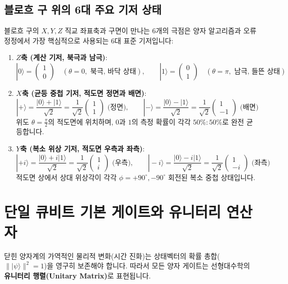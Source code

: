 \documentclass[11pt, a4paper]{article}
\newcommand{\ket}[1]{|#1\rangle}
\theoremstyle{definition}
\begin{document}
\subsection{블로흐 구 위의 6대 주요 기저 상태}
블로흐 구의 $X, Y, Z$ 직교 좌표축과 구면이 만나는 6개의 극점은 양자 알고리즘과 오류 정정에서 가장 핵심적으로 사용되는 6대 표준 기저입니다:
\begin{enumerate}
    \item \textbf{$Z$축 (계산 기저, 북극과 남극)}:
    $$\ket{0} = \begin{pmatrix} 1 \\ 0 \end{pmatrix} \quad (\theta=0, \text{ 북극, 바닥 상태}), \qquad \ket{1} = \begin{pmatrix} 0 \\ 1 \end{pmatrix} \quad (\theta=\pi, \text{ 남극, 들뜬 상태})$$
    \item \textbf{$X$축 (균등 중첩 기저, 적도면 정면과 배면)}:
    $$\ket{+} = \frac{\ket{0}+\ket{1}}{\sqrt{2}} = \frac{1}{\sqrt{2}}\begin{pmatrix} 1 \\ 1 \end{pmatrix} \text{ (정면)}, \qquad \ket{-} = \frac{\ket{0}-\ket{1}}{\sqrt{2}} = \frac{1}{\sqrt{2}}\begin{pmatrix} 1 \\ -1 \end{pmatrix} \text{ (배면)}$$
    위도 $\theta = \frac{\pi}{2}$의 적도면에 위치하며, $0$과 $1$의 측정 확률이 각각 $50\% : 50\%$로 완전 균등합니다.
    \item \textbf{$Y$축 (복소 위상 기저, 적도면 우측과 좌측)}:
    $$\ket{+i} = \frac{\ket{0}+i\ket{1}}{\sqrt{2}} = \frac{1}{\sqrt{2}}\begin{pmatrix} 1 \\ i \end{pmatrix} \text{ (우측)}, \qquad \ket{-i} = \frac{\ket{0}-i\ket{1}}{\sqrt{2}} = \frac{1}{\sqrt{2}}\begin{pmatrix} 1 \\ -i \end{pmatrix} \text{ (좌측)}$$
    적도면 상에서 상대 위상각이 각각 $\phi = +90^\circ, -90^\circ$ 회전된 복소 중첩 상태입니다.
\end{enumerate}

\section{단일 큐비트 기본 게이트와 유니터리 연산자}
닫힌 양자계의 가역적인 물리적 변화(시간 진화)는 상태벡터의 확률 총합($\|\ket{\psi}\|^2 = 1$)을 영구히 보존해야 합니다. 따라서 모든 양자 게이트는 선형대수학의 \textbf{유니터리 행렬(Unitary Matrix)}로 표현됩니다.
\end{document}
